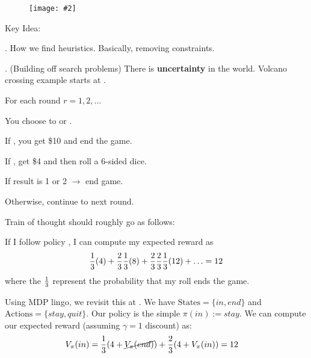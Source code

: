 \documentclass[11pt]{article}
\newcommand\myfig[2][0.3\textwidth]{\begin{figure}[h!]\centering\texttt{[image: \#2]}\end{figure}}
\newcommand\myspace[1][]{\vspace{#1\bigskipamount}\Needspace{10\baselineskip}}
\newcommand\p{\Needspace{10\baselineskip} \noindent}
\begin{document}
\myfig[0.6\textwidth]{figs/search2_astar_explore.png}

\begin{definition}{Key Idea:  }
\end{definition} 



\myspace
\p {} . How we find heuristics. Basically, removing constraints. 














\p {}. (Building off search problems) There is \textbf{uncertainty} in the world. Volcano crossing example starts at . 

\begin{example}
	For each round $r = 1, 2, \ldots$
	\begin{compactitem}
		\item You choose to  or . 
		\item If , you get \$10 and end the game.
		\item If , get \$4 and then roll a 6-sided dice. 
		\begin{compactitem}
			\item If result is 1 or 2 $\rightarrow$ end game.
			\item Otherwise, continue to next round.
		\end{compactitem}
	\end{compactitem}

	\tcblower

	Train of thought should roughly go as follows:
	\begin{compactitem}
		\item If I follow policy , I can compute my expected reward as
		\begin{align}
			\frac{1}{3} (4) + \frac{2}{3}\frac{1}{3} (8) + \frac{2}{3} \frac{2}{3} \frac{1}{3} (12) + \ldots = 12
		\end{align}
		where the $\frac{1}{3}$ represent the probability that my roll ends the game. 
	\end{compactitem}
	\vspace{1em}
	
	Using MDP lingo, we revisit this at . We have $\text{States} = \{in , end\}$ and $\text{Actions} = \{stay, quit\}$. Our policy is the simple $\pi(in) := stay$. We can compute our expected reward (assuming $\gamma =1$ discount) as:
	\begin{align}
		V_\pi(in) &= \frac{1}{3}(4 + \cancel{ V_\pi(end)  } )  + \frac{2}{3} (4 + V_\pi(in)) = 12
	\end{align}
	
\end{example}
\end{document}
